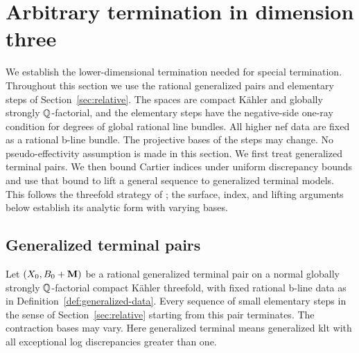 \section{Arbitrary termination in dimension three}\label{sec:threefold}

We establish the lower-dimensional termination needed for special
termination.  Throughout this section we use the rational generalized
pairs and elementary steps of Section~\ref{sec:relative}.
The spaces are compact K\"ahler and globally
strongly $\mathbb Q$-factorial, and the elementary steps have the negative-side
one-ray condition for degrees of global rational line bundles.  All higher
nef data are fixed as a rational b-line bundle.  The projective bases of the
steps may change.  No pseudo-effectivity assumption is made in this section.
We first treat generalized terminal pairs.  We then bound Cartier indices
under uniform discrepancy bounds and use that bound to lift a general
sequence to generalized terminal models.  This follows the threefold
strategy of \cite[Section~3]{CT2023}; the surface, index, and lifting
arguments below establish its analytic form with varying bases.

\subsection{Generalized terminal pairs}

\begin{proposition}\label{prop:terminal-three}
Let $(X_0,B_0+\mathbf M)$ be a rational generalized terminal pair on a normal
globally strongly $\mathbb Q$-factorial compact K\"ahler threefold, with fixed
rational b-line data as in Definition~\ref{def:generalized-data}.
Every sequence of small elementary steps in the sense of
Section~\ref{sec:relative} starting from
this pair terminates.  The contraction bases may vary.  Here generalized
terminal means generalized klt with all exceptional log discrepancies
greater than one.
\end{proposition}

